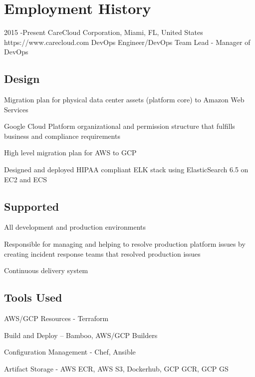 \documentclass[10pt]{article} %
\begin{document}
\section{Employment History}

\job
{2015 -}{Present}
{CareCloud Corporation, Miami, FL, United States}
{https://www.carecloud.com}
{DevOps Engineer/DevOps Team Lead - Manager of DevOps}
{\subsection{Design}
\begin{itemize-noindent}
\item{Migration plan for physical data center assets (platform core) to Amazon Web Services}
\item{Google Cloud Platform organizational and permission structure that fulfills business and compliance requirements}
\item{High level migration plan for AWS to GCP}
\item{Designed and deployed HIPAA compliant ELK stack using ElasticSearch 6.5 on EC2 and ECS}
\end{itemize-noindent}
\subsection{Supported}
\begin{itemize-noindent}
\item{All development and production environments}
\item{Responsible for managing and helping to resolve production platform issues by creating incident response teams that resolved production issues}
\item{Continuous delivery system}
\end{itemize-noindent}
\subsection{Tools Used}
\begin{itemize-noindent}
\item{AWS/GCP Resources - Terraform}
\item{Build and Deploy – Bamboo, AWS/GCP Builders}
\item{Configuration Management - Chef, Ansible}
\item{Artifact Storage - AWS ECR, AWS S3, Dockerhub, GCP GCR, GCP GS}
\end{itemize-noindent}}
\end{document}

